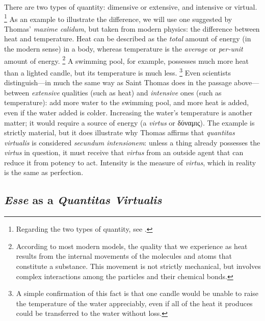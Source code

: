 There are two types of quantity: dimensive or extensive, and intensive or virtual.%
%
\footnote{Regarding the two types of quantity, see \cite[53]{villagrasa:resolutio}.}
%
As an example to illustrate the difference, we will use one suggested by Thomas’ \emph{maxime calidum}, but taken from modern physics: the difference between heat and temperature. Heat can be described as the \emph{total} amount of energy (in the modern sense) in a body, whereas temperature is the \emph{average} or \emph{per-unit} amount of energy.%
%
\footnote{According to most modern models, the quality that we experience as heat results from the internal movements of the molecules and atoms that constitute a substance. This movement is not strictly mechanical, but involves complex interactions among the particles and their chemical bonds.} A swimming pool, for example, possesses much more heat than a lighted candle, but its temperature is much less.%
%
\footnote{A simple confirmation of this fact is that one candle would be unable to raise the temperature of the water appreciably, even if all of the heat it produces could be transferred to the water without loss.} Even scientists distinguish—in much the same way as Saint Thomas does in the passage above—between \emph{extensive} qualities (such as heat) and \emph{intensive} ones (such as temperature): add more water to the swimming pool, and more heat is added, even if the water added is colder. Increasing the water’s temperature is another matter; it would require a source of energy (a \emph{virtus} or δύναμις). The example is strictly material, but it does illustrate why Thomas affirms that \emph{quantitas virtualis} is considered \emph{secundum intensionem}: unless a thing already possesses the \emph{virtus} in question, it must receive that \emph{virtus} from an outside agent that can reduce it from potency to act. Intensity is the measure of \emph{virtus}, which in reality is the same as perfection.

\subsection{\emph{Esse} as a \emph{Quantitas Virtualis}}

